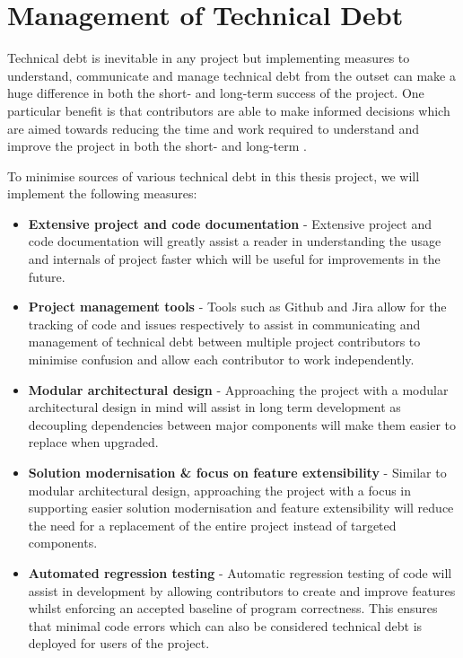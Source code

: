 \documentclass[hidelinks, 12pt]{extreport}
\begin{document}
\section{Management of Technical Debt}

Technical debt is inevitable in any project but implementing measures to understand, communicate and manage technical debt from the outset can make a huge difference in both the short- and long-term success of the project. One particular benefit is that contributors are able to make informed decisions which are aimed towards reducing the time and work required to understand and improve the project in both the short- and long-term \cite{TechnicalDebtManagement}.

To minimise sources of various technical debt in this thesis project, we will implement the following measures:
\begin{itemize}
	\item \textbf{Extensive project and code documentation} - Extensive project and code documentation will greatly assist a reader in understanding the usage and internals of project faster which will be useful for improvements in the future.
	\item \textbf{Project management tools} - Tools such as Github and Jira allow for the tracking of code and issues respectively to assist in communicating and management of technical debt between multiple project contributors to minimise confusion and allow each contributor to work independently.
	\item \textbf{Modular architectural design} - Approaching the project with a modular architectural design in mind will assist in long term development as decoupling dependencies between major components will make them easier to replace when upgraded.
	\item \textbf{Solution modernisation \& focus on feature extensibility} - Similar to modular architectural design, approaching the project with a focus in supporting easier solution modernisation and feature extensibility will reduce the need for a replacement of the entire project instead of targeted components.
	\item \textbf{Automated regression testing} - Automatic regression testing of code will assist in development by allowing contributors to create and improve features whilst enforcing an accepted baseline of program correctness. This ensures that minimal code errors which can also be considered technical debt is deployed for users of the project.
\end{itemize}
\end{document}
